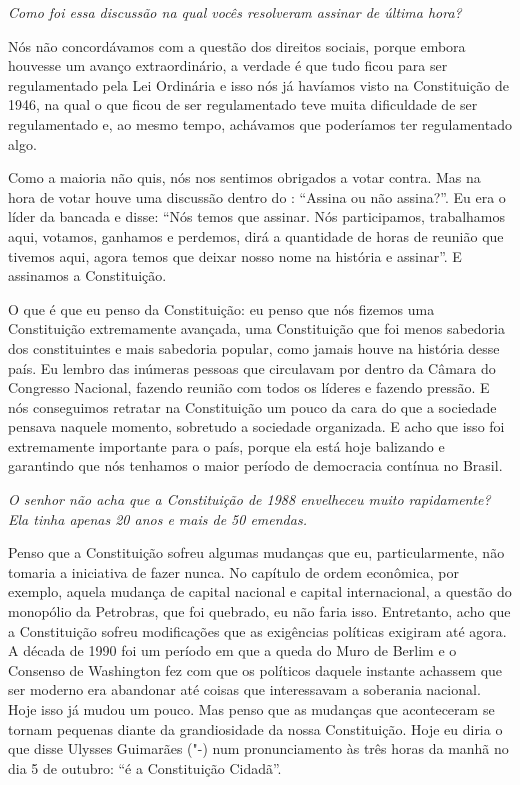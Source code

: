\medskip

\noindent\emph{Como foi essa discussão na qual vocês resolveram assinar de
última hora? }

Nós não concordávamos com a questão dos direitos sociais,
porque embora houvesse um avanço extraordinário, a verdade é que tudo
ficou para ser regulamentado pela Lei Ordinária e isso nós já havíamos
visto na Constituição de 1946, na qual o que ficou de ser regulamentado
teve muita dificuldade de ser regulamentado e, ao mesmo tempo, achávamos
que poderíamos ter regulamentado algo.

Como a maioria não quis, nós nos sentimos obrigados a votar contra. Mas
na hora de votar houve uma discussão dentro do : ``Assina ou não
assina?''. Eu era o líder da bancada e disse: ``Nós temos que assinar.
Nós participamos, trabalhamos aqui, votamos, ganhamos e perdemos, dirá a
quantidade de horas de reunião que tivemos aqui, agora temos que deixar
nosso nome na história e assinar''. E assinamos a Constituição.

O que é que eu penso da Constituição: eu penso que nós fizemos uma
Constituição extremamente avançada, uma Constituição que foi menos
sabedoria dos constituintes e mais sabedoria popular, como jamais houve
na história desse país. Eu lembro das inúmeras pessoas que circulavam
por dentro da Câmara do Congresso Nacional, fazendo reunião com todos os
líderes e fazendo pressão. E nós conseguimos retratar na Constituição
um pouco da cara do que a sociedade pensava naquele momento, sobretudo a
sociedade organizada. E acho que isso foi extremamente importante para o
país, porque ela está hoje balizando e garantindo que nós tenhamos o
maior período de democracia contínua no Brasil.

\medskip

\noindent\emph{O senhor não acha que a Constituição de 1988 envelheceu muito
rapidamente? Ela tinha apenas 20 anos e mais de 50 emendas.}

Penso que a Constituição sofreu algumas mudanças que eu,
particularmente, não tomaria a iniciativa de fazer nunca. No capítulo de
ordem econômica, por exemplo, aquela mudança de capital nacional e
capital internacional, a questão do monopólio da Petrobras, que foi
quebrado, eu não faria isso. Entretanto, acho que a Constituição sofreu
modificações que as exigências políticas exigiram até agora. A década de
1990 foi um período em que a queda do Muro de Berlim e o Consenso de
Washington fez com que os políticos daquele instante achassem que ser
moderno era abandonar até coisas que interessavam a soberania nacional.
Hoje isso já mudou um pouco. Mas penso que as mudanças que aconteceram
se tornam pequenas diante da grandiosidade da nossa Constituição. Hoje
eu diria o que disse Ulysses Guimarães ("-) num pronunciamento às
três horas da manhã no dia 5 de outubro: ``é a Constituição Cidadã''.

